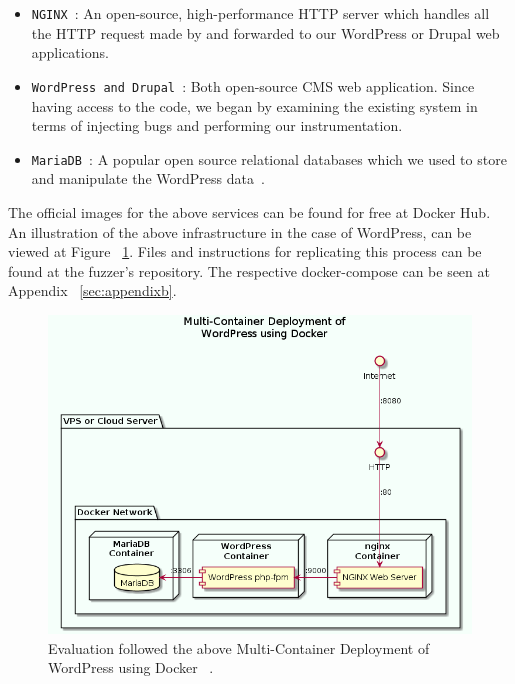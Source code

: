 \begin{itemize}
	\item {\tt NGINX }: An open-source, high-performance HTTP server which handles all the HTTP request made by \pname{} and forwarded to our WordPress or Drupal web applications.{~\cite{nginx}}
	\item {\tt WordPress and Drupal }: Both open-source CMS web application. Since having access to the code, we began by examining the existing system in terms of injecting bugs and performing our instrumentation.
	\item {\tt MariaDB }: A popular open source relational databases which we used to store and manipulate the WordPress data~\cite{mariadb}.
\end{itemize}

The official images for the above services can be found for free at Docker Hub. An illustration of the above infrastructure in the case of WordPress, can be viewed at Figure ~\ref{fig:multi-container}. Files and instructions for replicating this process can be found at the fuzzer's repository. The respective docker-compose can be seen at Appendix ~\ref{sec:appendixb}.

\begin{figure}[ht]
 \centering
 \captionsetup{justification=centering}
 \includegraphics[width=\linewidth]{figures/multi-container.png}
 \caption{Evaluation followed the above Multi-Container Deployment of WordPress using Docker ~\cite{multi-container}.}
 \label{fig:multi-container}
\end{figure}

